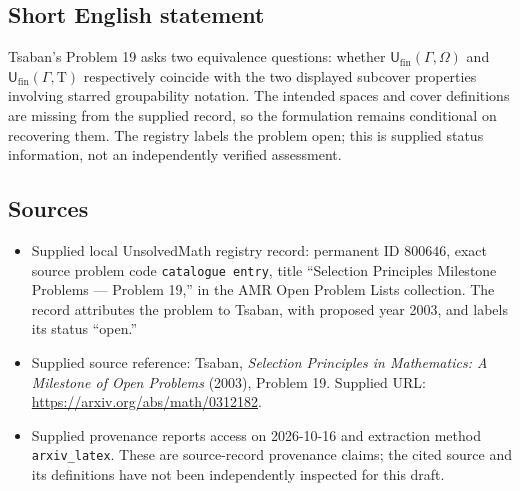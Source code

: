 \documentclass[11pt]{article}
\begin{document}
\subsection{Short English statement}
Tsaban's Problem 19 asks two equivalence questions: whether \(\mathsf U_{\mathrm{fin}}(\Gamma,\Omega)\) and \(\mathsf U_{\mathrm{fin}}(\Gamma,\mathrm T)\) respectively coincide with the two displayed subcover properties involving starred groupability notation. The intended spaces and cover definitions are missing from the supplied record, so the formulation remains conditional on recovering them. The registry labels the problem open; this is supplied status information, not an independently verified assessment.
\subsection{Sources}
\begin{itemize}
\item Supplied local UnsolvedMath registry record: permanent ID \(800646\), exact source problem code \texttt{catalogue entry}, title ``Selection Principles Milestone Problems --- Problem 19,'' in the AMR Open Problem Lists collection. The record attributes the problem to Tsaban, with proposed year 2003, and labels its status ``open.''
\item Supplied source reference: Tsaban, \emph{Selection Principles in Mathematics: A Milestone of Open Problems} (2003), Problem 19. Supplied URL: \url{https://arxiv.org/abs/math/0312182}.
\item Supplied provenance reports access on 2026-10-16 and extraction method \texttt{arxiv\_latex}. These are source-record provenance claims; the cited source and its definitions have not been independently inspected for this draft.
\end{itemize}
\end{document}
